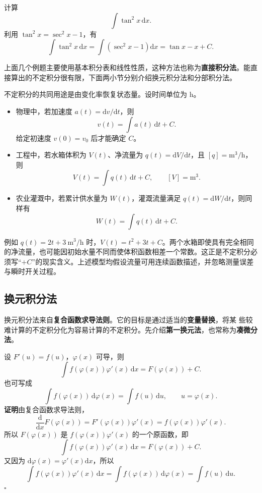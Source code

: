 \documentclass[fontset=fandol]{ctexart}
\newcommand{\dd}{\mathrm{d}}
\begin{document}
\begin{example}[三角恒等变形]
计算
\[
\int \tan^2x\,\dd x.
\]
利用 $\tan^2x=\sec^2x-1$，有
\[
\int\tan^2x\,\dd x=\int(\sec^2x-1)\dd x=\tan x-x+C.
\]
\end{example}

上面几个例题主要使用基本积分表和线性性质，这种方法也称为\textbf{直接积分法}。能直接算出的不定积分很有限，下面两小节分别介绍换元积分法和分部积分法。



\begin{application}[从变化率恢复状态量]
	不定积分的共同用途是由变化率恢复状态量。设时间单位为 $\mathrm h$。
	\begin{itemize}
		\item 物理中，若加速度 $a(t)=\dd v/\dd t$，则
		\[
		v(t)=\int a(t)\,\dd t+C.
		\]
		给定初速度 $v(0)=v_0$ 后才能确定 $C$。
		\item 工程中，若水箱体积为 $V(t)$、净流量为 $q(t)=\dd V/\dd t$，且 $[q]=\mathrm{m^3/h}$，则
		\[
		V(t)=\int q(t)\,\dd t+C,\qquad [V]=\mathrm{m^3}.
		\]
		\item 农业灌溉中，若累计供水量为 $W(t)$，灌溉流量满足 $q(t)=\dd W/\dd t$，则同样有
		\[
		W(t)=\int q(t)\,\dd t+C.
		\]
	\end{itemize}
	例如 $q(t)=2t+3\ \mathrm{m^3/h}$ 时，$V(t)=t^2+3t+C$。两个水箱即使具有完全相同的净流量，也可能因初始水量不同而使体积函数相差一个常数。这正是不定积分必须写“$+C$”的现实含义。上述模型均假设流量可用连续函数描述，并忽略测量误差与瞬时开关过程。
\end{application}




\subsection{换元积分法}

换元积分法来自\textbf{复合函数求导法则}。它的目标是通过适当的\textbf{变量替换}，将某
些较难计算的不定积分化为容易计算的不定积分。先介绍\textbf{第一换元法}，也常称为\textbf{凑微分法}。

\begin{theorem}[第一换元法]
设 $F'(u)=f(u)$，$\varphi(x)$ 可导，则
\[
\int f(\varphi(x))\varphi'(x)\,\dd x=F(\varphi(x))+C.
\]
也可写成
\[
\int f(\varphi(x))\,\dd\varphi(x)=\int f(u)\,\dd u,\qquad u=\varphi(x).
\]
\textbf{证明}\quad 由复合函数求导法则，
\[
\frac{\dd}{\dd x}F(\varphi(x))=F'(\varphi(x))\varphi'(x)=f(\varphi(x))\varphi'(x).
\]
所以 $F(\varphi(x))$ 是 $f(\varphi(x))\varphi'(x)$ 的一个原函数，即
\[
\int f(\varphi(x))\varphi'(x)\,\dd x=F(\varphi(x))+C.
\]
又因为 $\dd\varphi(x)=\varphi'(x)\dd x$，所以
\[
\int f(\varphi(x))\varphi'(x)\,\dd x
=\int f(\varphi(x))\,\dd\varphi(x)
=\int f(u)\,\dd u.
\]
\noindent\hfill$\square$
\end{theorem}
\end{document}
